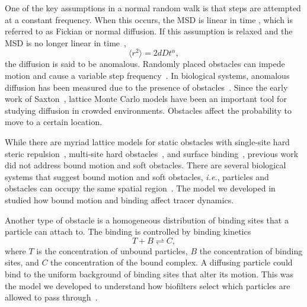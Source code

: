 One of the key assumptions in a normal random walk is that steps are attempted
at a constant frequency. When this occurs, the MSD is linear in time
, which is referred to as Fickian or normal diffusion. If this
assumption is relaxed and the MSD is no longer linear in
time~\cite{metzler_random_00}, 
%
\begin{equation}
  \label{eqn:msd_anomal}
  \langle r^2 \rangle =  2dD t ^ {\alpha},
\end{equation}
%
the diffusion is said to be anomalous.  Randomly placed obstacles can
impede motion and cause a variable step frequency~\cite{sokolov_fractional_02,
  saxton_anomalous_94}.  In biological systems, anomalous diffusion has been
measured due to the presence of obstacles~\cite{feder_constrained_96,
  weiss_anomalous_04, ghosh_automated_94}.  Since the early work of
Saxton~\cite{saxton_lateral_87}, lattice Monte Carlo models have been an
important tool for studying diffusion in crowded environments.  Obstacles affect
the probability to move to a certain location.

While there are myriad lattice models for static obstacles with single-site hard
steric repulsion~\cite{saxton_lateral_87, saxton_anomalous_94}, multi-site hard
obstacles~\cite{ellery_characterizing_14, ellery_modeling_16}, and surface
binding~\cite{saxton_anomalous_96, ellery_analytical_16}, previous work did not
address bound motion and soft obstacles.  There are several biological systems
that suggest bound motion and soft obstacles, \textit{i.e.}, particles and
obstacles can occupy the same spatial region~\cite{brangwynne_germline_09,
  molliex_phase_15, hough_molecular_15,
  raveh_slideandexchange_16,timney_simple_16}.  The model we developed
in~\cite{stefferson_effects_17} studied how bound motion and binding affect
tracer dynamics. 

Another type of obstacle is a homogeneous distribution of binding sites that a
particle can attach to. The binding is controlled by binding kinetics
%
\begin{equation}
  T + B \rightleftharpoons C,
\end{equation}
%
where $T$ is the concentration of unbound particles, $B$ the concentration of
binding sites, and $C$ the concentration of the bound complex.  A diffusing
particle could bind to the uniform background of binding sites that alter its
motion. This was the model we developed to understand how biofilters select
which particles are allowed to pass through~\cite{maguire_design_18}.

